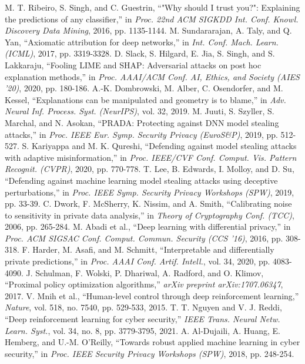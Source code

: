  M. T. Ribeiro, S. Singh, and C. Guestrin, ``"Why should I trust you?": Explaining the predictions of any classifier,'' in \textit{Proc. 22nd ACM SIGKDD Int. Conf. Knowl. Discovery Data Mining}, 2016, pp. 1135-1144.
 M. Sundararajan, A. Taly, and Q. Yan, ``Axiomatic attribution for deep networks,'' in \textit{Int. Conf. Mach. Learn. (ICML)}, 2017, pp. 3319-3328.
 D. Slack, S. Hilgard, E. Jia, S. Singh, and S. Lakkaraju, ``Fooling LIME and SHAP: Adversarial attacks on post hoc explanation methods,'' in \textit{Proc. AAAI/ACM Conf. AI, Ethics, and Society (AIES '20)}, 2020, pp. 180-186.
 A.-K. Dombrowski, M. Alber, C. Osendorfer, and M. Kessel, ``Explanations can be manipulated and geometry is to blame,'' in \textit{Adv. Neural Inf. Process. Syst. (NeurIPS)}, vol. 32, 2019.
 M. Juuti, S. Szyller, S. Marchal, and N. Asokan, ``PRADA: Protecting against DNN model stealing attacks,'' in \textit{Proc. IEEE Eur. Symp. Security Privacy (EuroS\&P)}, 2019, pp. 512-527.
 S. Kariyappa and M. K. Qureshi, ``Defending against model stealing attacks with adaptive misinformation,'' in \textit{Proc. IEEE/CVF Conf. Comput. Vis. Pattern Recognit. (CVPR)}, 2020, pp. 770-778.
 T. Lee, B. Edwards, I. Molloy, and D. Su, ``Defending against machine learning model stealing attacks using deceptive perturbations,'' in \textit{Proc. IEEE Symp. Security Privacy Workshops (SPW)}, 2019, pp. 33-39.
 C. Dwork, F. McSherry, K. Nissim, and A. Smith, ``Calibrating noise to sensitivity in private data analysis,'' in \textit{Theory of Cryptography Conf. (TCC)}, 2006, pp. 265-284.
 M. Abadi et al., ``Deep learning with differential privacy,'' in \textit{Proc. ACM SIGSAC Conf. Comput. Commun. Security (CCS '16)}, 2016, pp. 308-318.
 F. Harder, M. Asafi, and M. Schmitt, ``Interpretable and differentially private predictions,'' in \textit{Proc. AAAI Conf. Artif. Intell.}, vol. 34, 2020, pp. 4083-4090.
 J. Schulman, F. Wolski, P. Dhariwal, A. Radford, and O. Klimov, ``Proximal policy optimization algorithms,'' \textit{arXiv preprint arXiv:1707.06347}, 2017.
 V. Mnih et al., ``Human-level control through deep reinforcement learning,'' \textit{Nature}, vol. 518, no. 7540, pp. 529-533, 2015.
 T. T. Nguyen and V. J. Reddi, ``Deep reinforcement learning for cyber security,'' \textit{IEEE Trans. Neural Netw. Learn. Syst.}, vol. 34, no. 8, pp. 3779-3795, 2021.
 A. Al-Dujaili, A. Huang, E. Hemberg, and U.-M. O'Reilly, ``Towards robust applied machine learning in cyber security,'' in \textit{Proc. IEEE Security Privacy Workshops (SPW)}, 2018, pp. 248-254.
